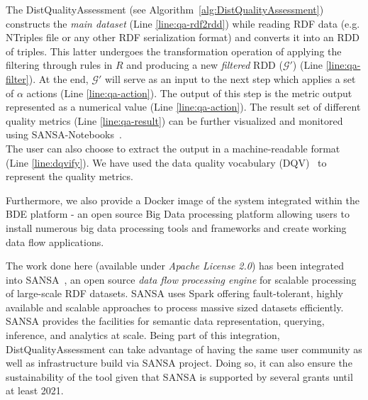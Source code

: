 The DistQualityAssessment (see Algorithm~\ref{alg:DistQualityAssessment}) constructs the \emph{main dataset} (Line \ref{line:qa-rdf2rdd}) while reading \gls{RDF} data (e.g. NTriples file or any other \gls{RDF} serialization format) and converts it into an \gls{RDD} of triples.
This latter undergoes the transformation operation of applying the filtering through rules in $R$ and producing a new \emph{filtered} \gls{RDD} ($\mathcal{G'}$) (Line \ref{line:qa-filter}).
At the end, $\mathcal{G'}$ will serve as an input to the next step which applies a set of $\alpha$ actions (Line \ref{line:qa-action}).
The output of this step is the metric output represented as a numerical value (Line \ref{line:qa-action}). 
The result set of different quality metrics (Line \ref{line:qa-result}) can be further visualized and monitored using SANSA-Notebooks~\cite{iermilov-2017-sansa-iswc-demo}.\\
The user can also choose to extract the output in a machine-readable format (Line \ref{line:dqvify}). 
We have used the data quality vocabulary (DQV)~\cite{Isaac:16:dqv} to represent the quality metrics. 

Furthermore, we also provide a Docker image of the system integrated within the BDE platform - an open source Big Data processing platform allowing users to install numerous big data processing tools and frameworks and create working data flow applications.

The work done here (available under \textit{Apache License 2.0}) has been integrated into SANSA~\cite{lehmann-2017-sansa-iswc}, an open source \emph{data flow processing engine} for scalable processing of large-scale \gls{RDF} datasets. 
SANSA uses Spark offering fault-tolerant, highly available and scalable approaches to process massive sized datasets efficiently. 
SANSA provides the facilities for semantic data representation, querying, inference, and analytics at scale.
Being part of this integration, DistQualityAssessment can take advantage of having the same user community as well as infrastructure build via SANSA project.
Doing so, it can also ensure the sustainability of the tool given that SANSA is supported by several grants until at least 2021.

